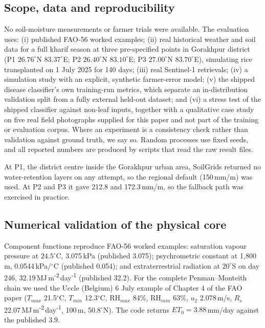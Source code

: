 \documentclass[11pt,a4paper]{article}
\begin{document}
\subsection{Scope, data and reproducibility}

No soil-moisture measurements or farmer trials were available. The evaluation uses: (i) published FAO-56 worked examples; (ii) real historical weather and soil data for a full kharif season at three pre-specified points in Gorakhpur district (P1 $26.76^{\circ}$N $83.37^{\circ}$E; P2 $26.40^{\circ}$N $83.10^{\circ}$E; P3 $27.00^{\circ}$N $83.70^{\circ}$E), simulating rice transplanted on 1 July 2025 for 140 days; (iii) real Sentinel-1 retrievals; (iv) a simulation study with an explicit, synthetic farmer-error model; (v) the shipped disease classifier's own training-run metrics, which separate an in-distribution validation split from a fully external held-out dataset; and (vi) a stress test of the shipped classifier against non-leaf inputs, together with a qualitative case study on five real field photographs supplied for this paper and not part of the training or evaluation corpus. Where an experiment is a consistency check rather than validation against ground truth, we say so. Random processes use fixed seeds, and all reported numbers are produced by scripts that read the raw result files.

At P1, the district centre inside the Gorakhpur urban area, SoilGrids returned no water-retention layers on any attempt, so the regional default (150\,mm/m) was used. At P2 and P3 it gave 212.8 and 172.3\,mm/m, so the fallback path was exercised in practice.

\subsection{Numerical validation of the physical core}

Component functions reproduce FAO-56 worked examples: saturation vapour pressure at $24.5^{\circ}$C, 3.075\,kPa (published 3.075); psychrometric constant at 1{,}800\,m, 0.0544\,kPa/$^{\circ}$C (published 0.054); and extraterrestrial radiation at $20^{\circ}$S on day 246, 32.19\,MJ\,m\textsuperscript{-2}\,day\textsuperscript{-1} (published 32.2). For the complete Penman--Monteith chain we used the Uccle (Belgium) 6 July example of Chapter 4 of the FAO paper ($T_{max}$ 21.5$^{\circ}$C, $T_{min}$ 12.3$^{\circ}$C, RH$_{max}$ 84\%, RH$_{min}$ 63\%, $u_2$ 2.078\,m/s, $R_s$ 22.07\,MJ\,m\textsuperscript{-2}\,day\textsuperscript{-1}, 100\,m, 50.8$^{\circ}$N). The code returns $ET_0 = 3.88$\,mm/day against the published 3.9.
\end{document}

